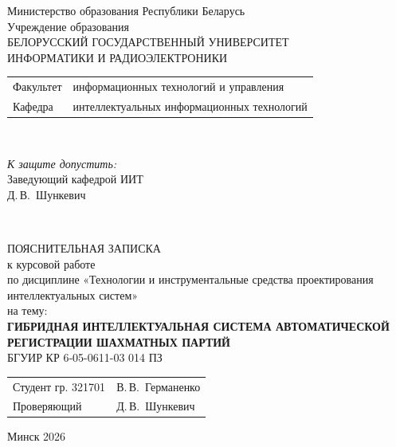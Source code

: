 \begin{titlepage}
  \begin{center}
    Министерство образования Республики Беларусь\\[1em]
    Учреждение образования\\
    БЕЛОРУССКИЙ ГОСУДАРСТВЕННЫЙ УНИВЕРСИТЕТ \\
    ИНФОРМАТИКИ И РАДИОЭЛЕКТРОНИКИ\\[1em]

    \begin{minipage}{\textwidth}
      \begin{flushleft}
        \begin{tabular}{ l l }
          Факультет & информационных технологий и управления\\
          Кафедра   & интеллектуальных информационных технологий
        \end{tabular}
      \end{flushleft}
    \end{minipage}\\[1em]

    \begin{flushright}
      \begin{minipage}{0.4\textwidth}
        \textit{К защите допустить:}\\[0.8em]
        Заведующий кафедрой ИИТ\\[0.45em]
        \underline{\hspace*{2.8cm}} Д.\,В.~Шункевич
      \end{minipage}\\[2.2em]
    \end{flushright}

    {ПОЯСНИТЕЛЬНАЯ ЗАПИСКА}\\
    {к курсовой работе}\\
    {по дисциплине «Технологии и инструментальные средства проектирования интеллектуальных систем»}\\
    {на тему:}\\[1em]
    \textbf{\large ГИБРИДНАЯ ИНТЕЛЛЕКТУАЛЬНАЯ СИСТЕМА АВТОМАТИЧЕСКОЙ РЕГИСТРАЦИИ ШАХМАТНЫХ ПАРТИЙ}\\[1em]


    {БГУИР КР 6‑05-0611-03 014 ПЗ}\\[2em]
    \vspace{2em}
    \begin{tabular}{ p{}p{} }
      Студент гр. 321701 & В.\,В.~Германенко \\
      Проверяющий & Д.\,В.~Шункевич \\
    \end{tabular}
    
    \vfill
    {\normalsize Минск 2026}
  \end{center}
\end{titlepage}
